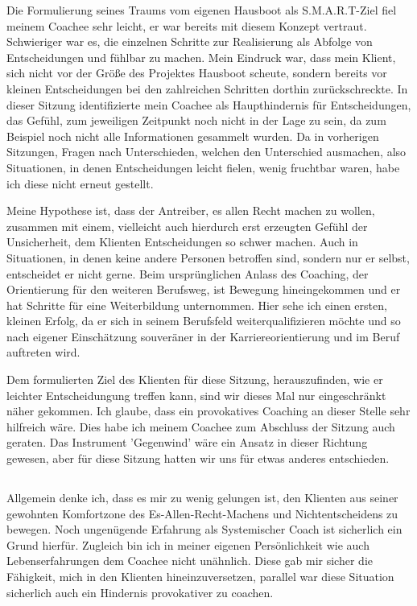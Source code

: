 \documentclass[11pt,a4paper]{article}
\begin{document}
Die Formulierung seines Traums vom eigenen Hausboot als S.M.A.R.T-Ziel fiel meinem Coachee sehr leicht, er war bereits mit diesem Konzept vertraut. Schwieriger war es, die einzelnen Schritte zur Realisierung als Abfolge von Entscheidungen und fühlbar zu machen. Mein Eindruck war, dass mein Klient, sich nicht vor der Größe des Projektes Hausboot scheute, sondern bereits vor kleinen Entscheidungen bei den zahlreichen Schritten dorthin zurückschreckte. In dieser Sitzung identifizierte mein Coachee als Haupthindernis für Entscheidungen, das Gefühl, zum jeweiligen Zeitpunkt noch nicht in der Lage zu sein, da zum Beispiel noch nicht alle Informationen gesammelt wurden. Da in vorherigen Sitzungen, Fragen nach Unterschieden, welchen den Unterschied ausmachen, also Situationen, in denen Entscheidungen leicht fielen, wenig fruchtbar waren, habe ich diese nicht erneut gestellt. 

Meine Hypothese ist, dass der Antreiber, es allen Recht machen zu wollen, zusammen mit einem, vielleicht auch hierdurch erst erzeugten Gefühl der Unsicherheit, dem Klienten Entscheidungen so schwer machen. Auch in Situationen, in denen keine andere Personen betroffen sind, sondern nur er selbst, entscheidet er nicht gerne. Beim ursprünglichen Anlass des Coaching, der Orientierung für den weiteren Berufsweg, ist Bewegung hineingekommen und er hat Schritte für eine Weiterbildung unternommen. Hier sehe ich einen ersten, kleinen Erfolg, da er sich in seinem Berufsfeld weiterqualifizieren möchte und so nach eigener Einschätzung souveräner in der Karriereorientierung und im Beruf auftreten wird.

Dem formulierten Ziel des Klienten für diese Sitzung, herauszufinden, wie er leichter Entscheidungung treffen kann, sind wir dieses Mal nur eingeschränkt näher gekommen. Ich glaube, dass ein provokatives Coaching an dieser Stelle sehr hilfreich wäre. Dies habe ich meinem Coachee zum Abschluss der Sitzung auch geraten. Das Instrument 'Gegenwind' wäre ein Ansatz in dieser Richtung gewesen, aber für diese Sitzung hatten wir uns für etwas anderes entschieden.


\subsection*{\color{Orange}{Schlussbetrachtung des Coaching-Prozesses}}


Allgemein denke ich, dass es mir zu wenig gelungen ist, den Klienten aus seiner gewohnten Komfortzone des Es-Allen-Recht-Machens und Nichtentscheidens zu bewegen. Noch ungenügende Erfahrung als Systemischer Coach ist sicherlich ein Grund hierfür. Zugleich bin ich in meiner eigenen Persönlichkeit wie auch Lebenserfahrungen dem Coachee nicht unähnlich. Diese gab mir sicher die Fähigkeit, mich in den Klienten hineinzuversetzen, parallel war diese Situation sicherlich auch ein Hindernis provokativer zu coachen.  
\end{document}
